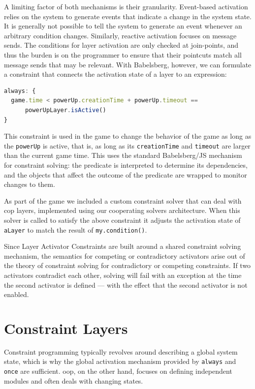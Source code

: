 A limiting factor of both mechanisms is their granularity. Event-based
activation relies on the system to generate events that indicate a change in the
system state. It is generally not possible to tell the system to generate an
event whenever an arbitrary condition changes. Similarly, reactive activation
focuses on message sends. The conditions for layer activation are only checked
at join-points, and thus the burden is on the programmer to ensure that their
pointcuts match all message sends that may be relevant. With Babelsberg,
however, we can formulate a constraint that connects the activation state of a
layer to an expression:
\begin{lstlisting}[language=JavaScript]
always: { 
  game.time < powerUp.creationTime + powerUp.timeout ==
      powerUpLayer.isActive() 
}
\end{lstlisting}
This constraint is used in the game to change the behavior of the game as long
as the \verb!powerUp! is active, that is, as long as its \verb!creationTime! and
\verb!timeout! are larger than the current game time. This uses the standard
Babelsberg/JS mechanism for constraint solving: the predicate is interpreted to
determine its dependencies, and the objects that affect the outcome of the
predicate are wrapped to monitor changes to them.

As part of the game we included a custom constraint solver that can deal with
\ac{cop} layers, implemented using our cooperating solvers architecture. When
this solver is called to satisfy the above constraint it adjusts the activation
state of \lstinline!aLayer! to match the result of \lstinline{my.condition()}.

Since Layer Activator Constraints are built around a shared constraint
solving mechanism, the semantics for competing or contradictory activators arise
out of the theory of constraint solving for contradictory or competing
constraints. If two activators contradict each other, solving will fail with an
exception at the time the second activator is defined --- with the effect that the
second activator is not enabled.

\section{Constraint Layers}
\label{sec:constraint-layers}

Constraint programming typically revolves around describing a global system
state, which is why the global activation mechanism provided by
\lstinline{always} and \lstinline{once} are sufficient. \ac{oop}, on the other
hand, focuses on defining independent modules and often deals with changing
states.

